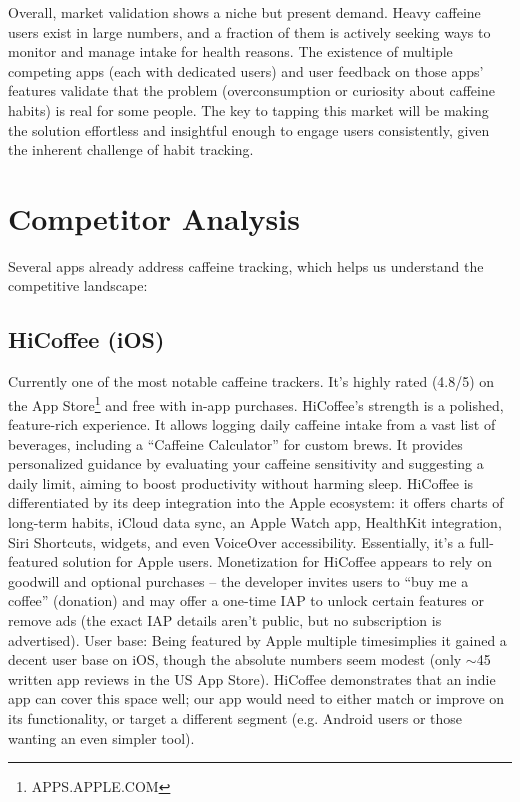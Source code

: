 \documentclass{article}
\begin{document}
Overall, market validation shows a niche but present demand. Heavy caffeine users exist in large numbers, and a fraction of them is actively seeking ways to monitor and manage intake for health reasons. The existence of multiple competing apps (each with dedicated users) and user feedback on those apps’ features validate that the problem (overconsumption or curiosity about caffeine habits) is real for some people. The key to tapping this market will be making the solution effortless and insightful enough to engage users consistently, given the inherent challenge of habit tracking.

\section{Competitor Analysis}
Several apps already address caffeine tracking, which helps us understand the competitive landscape:

\subsection{HiCoffee (iOS)}
Currently one of the most notable caffeine trackers. It’s highly rated (4.8/5) on the App Store\footnote{APPS.APPLE.COM} and free with in-app purchases. HiCoffee’s strength is a polished, feature-rich experience. It allows logging daily caffeine intake from a vast list of beverages, including a “Caffeine Calculator” for custom brews\footnotemark[5]. It provides personalized guidance by evaluating your caffeine sensitivity and suggesting a daily limit\footnotemark[5], aiming to boost productivity without harming sleep. HiCoffee is differentiated by its deep integration into the Apple ecosystem: it offers charts of long-term habits, iCloud data sync, an Apple Watch app, HealthKit integration, Siri Shortcuts, widgets, and even VoiceOver accessibility\footnotemark[5, 6]. Essentially, it’s a full-featured solution for Apple users. Monetization for HiCoffee appears to rely on goodwill and optional purchases – the developer invites users to “buy me a coffee” (donation) and may offer a one-time IAP to unlock certain features or remove ads (the exact IAP details aren’t public, but no subscription is advertised). User base: Being featured by Apple multiple times\footnotemark[5] implies it gained a decent user base on iOS, though the absolute numbers seem modest (only \(\sim\)45 written app reviews in the US App Store\footnotemark[5]). HiCoffee demonstrates that an indie app can cover this space well; our app would need to either match or improve on its functionality, or target a different segment (e.g. Android users or those wanting an even simpler tool).
\end{document}
